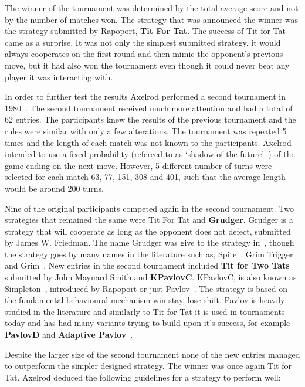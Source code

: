 The winner of the tournament was determined by the total average score and not
by the number of matches won. The strategy that was announced the winner was the
strategy submitted by Rapoport, \textbf{Tit For Tat}. The success of Tit for Tat
came as a surprise. It was not only the simplest submitted strategy, it would
always cooperates on the first round and then mimic the opponent's previous
move, but it had also won the tournament even though it could never beat
any player it was interacting with.

In order to further test the results Axelrod performed a second tournament
in 1980~\cite{Axelrod1980b}. The second tournament received much more attention
and had a total of 62 entries. The participants knew the results of the previous
tournament and the rules were similar with only a few alterations. The
tournament was repeated 5 times and the length of each match was not known to
the participants. Axelrod intended to use a fixed probability (refereed to as
`shadow of the future'~\cite{Axelrod1988}) of the game ending on the next move.
However, 5 different number of turns were selected for each match 63, 77, 151,
308 and 401, such that the average length would be around 200 turns.

Nine of the original participants competed again in the second tournament. Two
strategies that remained the same were Tit For Tat and \textbf{Grudger}. Grudger
is a strategy that will cooperate as long as the opponent does not defect,
submitted by James W. Friedman. The name Grudger was give to the strategy
in~\cite{Li2014}, though the strategy goes by many names in the literature such
as, Spite~\cite{Beaufils1997}, Grim Trigger~\cite{Banks1990} and
Grim~\cite{Van2015}. New entries in the second tournament included \textbf{Tit
for Two Tats} submitted by John Maynard Smith and \textbf{KPavlovC}. KPavlovC,
is also known as Simpleton~\cite{rapoport1965}, introduced by Rapoport or just
Pavlov~\cite{Nowak1993}. The strategy is based on the fundamental behavioural
mechanism win-stay, lose-shift. Pavlov is heavily studied in the literature and
similarly to Tit for Tat it is used in tournaments today and has
had many variants trying to build upon it's success, for example
\textbf{PavlovD} and \textbf{Adaptive Pavlov}~\cite{Li2007}.

Despite the larger size of the second tournament none of the new entries managed
to outperform the simpler designed strategy. The winner was once again Tit for
Tat. Axelrod deduced the following guidelines for a strategy to perform well:

